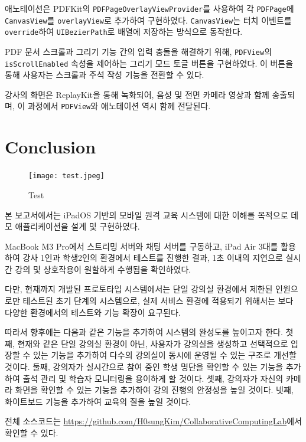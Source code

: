 \documentclass[pdflatex,sn-mathphys-num]{sn-jnl}%
\theoremstyle{thmstyleone}%
\theoremstyle{thmstyletwo}%
\theoremstyle{thmstylethree}%
\begin{document}
애노테이션은 PDFKit의 \verb+PDFPageOverlayViewProvider+를 사용하여 각 \verb+PDFPage+에 \verb+CanvasView+를 \verb+overlayView+로 추가하여 구현하였다. \verb+CanvasView+는 터치 이벤트를 \verb+override+하여 \verb+UIBezierPath+로 배열에 저장하는 방식으로 동작한다.

PDF 문서 스크롤과 그리기 기능 간의 입력 충돌을 해결하기 위해, \verb+PDFView+의 \verb+isScrollEnabled+ 속성을 제어하는 그리기 모드 토글 버튼을 구현하였다. 이 버튼을 통해 사용자는 스크롤과 주석 작성 기능을 전환할 수 있다.

강사의 화면은 ReplayKit\cite{ReplayKit}을 통해 녹화되어, 음성 및 전면 카메라 영상과 함께 송출되며, 이 과정에서 \verb+PDFView+와 애노테이션 역시 함께 전달된다.

\section{Conclusion}\label{sec4}

\begin{figure}[h]
\centering
\texttt{[image: test.jpeg]}
\caption{Test}\label{fig3}
\end{figure}

본 보고서에서는 iPadOS 기반의 모바일 원격 교육 시스템에 대한 이해를 목적으로 데모 애플리케이션을 설계 및 구현하였다.

MacBook M3 Pro에서 스트리밍 서버와 채팅 서버를 구동하고, iPad Air 3대를 활용하여 강사 1인과 학생2인의 환경에서 테스트를 진행한 결과, 1초 이내의 지연으로 실시간 강의 및 상호작용이 원할하게 수행됨을 확인하였다.

다만, 현재까지 개발된 프로토타입 시스템에서는 단일 강의실 환경에서 제한된 인원으로만 테스트된 초기 단계의 시스템으로, 실제 서비스 환경에 적용되기 위해서는 보다 다양한 환경에서의 테스트와 기능 확장이 요구된다.

따라서 향후에는 다음과 같은 기능을 추가하여 시스템의 완성도를 높이고자 한다.
첫째, 현재와 같은 단일 강의실 환경이 아닌, 사용자가 강의실을 생성하고 선택적으로 입장할 수 있는 기능을 추가하여 다수의 강의실이 동시에 운영될 수 있는 구조로 개선할 것이다.
둘째, 강의자가 실시간으로 참여 중인 학생 명단을 확인할 수 있는 기능을 추가하여 출석 관리 및 학습자 모니터링을 용이하게 할 것이다.
셋째, 강의자가 자신의 카메라 화면을 확인할 수 있는 기능을 추가하여 강의 진행의 안정성을 높일 것이다.
넷째, 화이트보드 기능을 추가하여 교육의 질을 높일 것이다.

전체 소스코드는 \url{https://github.com/H0sungKim/CollaborativeComputingLab}에서 확인할 수 있다.



\end{document}
